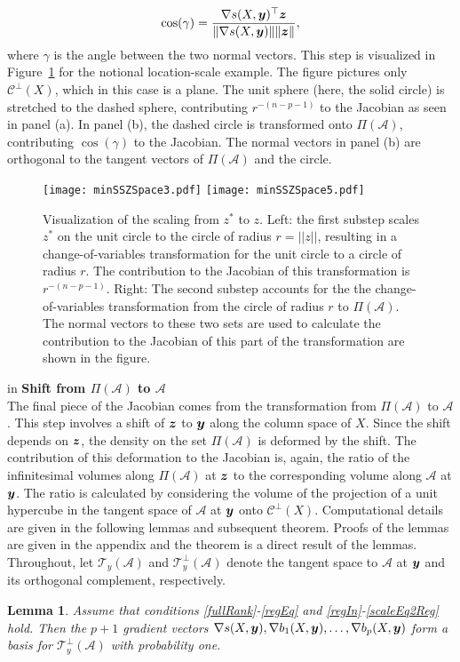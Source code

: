 \documentclass[ba]{imsart}
\newcommand{\by}{\mbox{\boldmath $y$}}
\newcommand{\bz}{\mbox{\boldmath $z$}}
\newcommand{\mc}{\mathcal}
\newtheorem{lemma}[theorem]{\bf Lemma}
\begin{document}
\begin{equation}
\label{cosine}
\cos(\gamma)=\frac{\nabla s(X,\by)^\top \bz}{\|\nabla
s(X,\by)\| \|\bz\|},
\end{equation}
where $\gamma$ is the angle between the two normal vectors.
This step is visualized in Figure~\ref{fig:stretchDeform} for the notional
location-scale example.  The figure pictures only $\mathcal{C}^{\perp}(X)$,
which in this case is a plane. The unit sphere (here, the
solid circle) is stretched to the dashed sphere, contributing
$r^{-(n-p-1)}$ to the Jacobian as seen in panel (a). In panel (b), the
dashed circle is transformed onto $\Pi(\mc A)$, contributing
$\cos(\gamma)$ to the Jacobian. The normal vectors in panel (b) are
orthogonal to the tangent vectors of $\Pi(\mc A)$ and the circle. 

\begin{figure}[t]
\centering
{\texttt{[image: minSSZSpace3.pdf]}}
{\texttt{[image: minSSZSpace5.pdf]}}
\caption{Visualization of the scaling from $z^{*}$ to $z$. Left: the first substep scales $z^{*}$ on the unit circle to the circle of radius $r = ||z||$, resulting in a change-of-variables transformation for the unit circle to a circle of radius $r$. The contribution to the Jacobian of this transformation is $r^{-(n-p-1)}$. Right: The second substep accounts for the the change-of-variables transformation from the circle of radius $r$ to $\Pi(\mathcal{A})$. The normal vectors to these two sets are used to calculate the contribution to the Jacobian of this part of the transformation are shown in the figure.}
\label{fig:stretchDeform}
\end{figure}



 in
\noindent
{\bf Shift from $\Pi(\mathcal{A})$ to $\mathcal{A}$} \\
The final piece of the Jacobian comes from the transformation from
$\Pi(\mathcal{A})$ to $\mathcal{A}$.  %
This step involves a shift of
$\bz$ to $\by$ along the column space of $X$. Since the shift depends on 
$\bz$, the density on the set 
$\Pi(\mathcal{A})$ is deformed by the shift. The
contribution of this deformation to the Jacobian is, again,
the ratio of the infinitesimal volumes along $\Pi(\mathcal{A})$ at $\bz$ to the
corresponding volume along $\mathcal{A}$ at $\by$. 
The ratio is calculated by considering the volume of the
projection of a unit hypercube in the tangent space of $\mathcal{A}$
at $\by$ onto $\mc{C}^\perp(X)$.
Computational details are
given in the following lemmas and subsequent theorem. Proofs of the lemmas are given in the appendix and the theorem is a direct result of the lemmas. Throughout, let
$\mc T_{y}(\mc A)$ and $\mc T_{y}^{\perp}(\mc A)$ denote the tangent
space to $\mc A$ at $\by$ and its orthogonal complement, respectively. %
\begin{lemma}
\label{lem:basis}
Assume that conditions \ref{fullRank}-\ref{regEq} and \ref{regIn}-\ref{scaleEq2Reg} hold.  Then the $p+1$ gradient vectors 
$\nabla s(X,\by), \nabla b_1(X,\by),\dots, \nabla b_p(X,\by)$ form a
basis for $\mc T_{y}^\perp(\mc A)$ with probability one.
\end{lemma}
\end{document}
